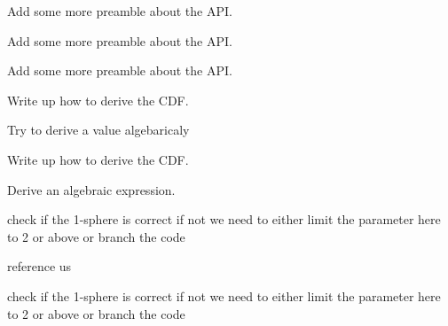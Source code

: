 
\begin{DoxyRefList}
\item[\label{todo__todo000012}%
\hypertarget{todo__todo000012}{}%
Group \hyperlink{group__api}{api} ]Add some more preamble about the A\-P\-I.



Add some more preamble about the A\-P\-I.



Add some more preamble about the A\-P\-I.


\item[\label{todo__todo000001}%
\hypertarget{todo__todo000001}{}%
Global \hyperlink{_cube_8h_aa32dd25cda8601c7f6af2dbd096dc58c}{Cube\-Distance\-C\-D\-F} (double a, double $\ast$b)]Write up how to derive the C\-D\-F.  
\item[\label{todo__todo000002}%
\hypertarget{todo__todo000002}{}%
Global \hyperlink{_cube_8h_ac37d5ff3c99d8637fc414212ac041f18}{Cube\-Distance\-Var} (double $\ast$parameters)]Try to derive a value algebaricaly  
\item[\label{todo__todo000003}%
\hypertarget{todo__todo000003}{}%
Global \hyperlink{_disk_8h_a8958adae00c0c55d68c1e81deb51c06b}{Disk\-Distance\-C\-D\-F} (double a, double $\ast$b)]Write up how to derive the C\-D\-F.  
\item[\label{todo__todo000004}%
\hypertarget{todo__todo000004}{}%
Global \hyperlink{_disk_8h_a156ab336770f189207572a9282158392}{Disk\-Distance\-Var} (double $\ast$parameters)]Derive an algebraic expression.  
\item[\label{todo__todo000007}%
\hypertarget{todo__todo000007}{}%
Global \hyperlink{_hyper_sphere_8h_a1fd054315809f3be16b79fc198a2a9b8}{Hyper\-Sphere\-Distance\-Check\-Parameters} (double $\ast$parameters, int $\ast$result, char $\ast$error\-\_\-str)]check if the 1-\/sphere is correct if not we need to either limit the parameter here to 2 or above or branch the code  
\item[\label{todo__todo000005}%
\hypertarget{todo__todo000005}{}%
Global \hyperlink{_hyper_sphere_8h_ac9f09ad018eaa239847e438a60d75aa3}{Hyper\-Sphere\-Distance\-P\-D\-F} (double t, double $\ast$parameters)]reference us  
\item[\label{todo__todo000010}%
\hypertarget{todo__todo000010}{}%
Global \hyperlink{_hyper_sphere_geodesic_8h_a0d1f54ac3a880c1c99d1ca5e85bd8256}{Hyper\-Sphere\-Geodesic\-Distance\-Check\-Parameters} (double $\ast$parameters, int $\ast$result, char $\ast$error\-\_\-str)]check if the 1-\/sphere is correct if not we need to either limit the parameter here to 2 or above or branch the code  

\end{DoxyRefList}
